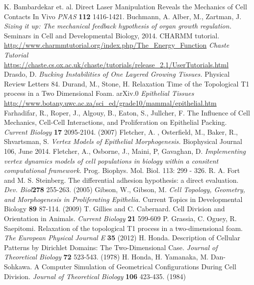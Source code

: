 \begin{thebibliography}{1}
 K. Bambardekar et. al. Direct Laser Manipulation Reveals the Mechanics of Cell Contacts In Vivo \emph{PNAS} \textbf{112} 1416-1421.
 Buchmann, A. Alber, M., Zartman, J. \emph{ Sizing it up: The mechanical feedback hypothesis of organ growth regulation.} Seminars in Cell and Developmental Biology, 2014.
 CHARMM tutorial. \url{http://www.charmmtutorial.org/index.php/The_Energy_Function}
 \emph{Chaste Tutorial} \url{https://chaste.cs.ox.ac.uk/chaste/tutorials/release_2.1/UserTutorials.html}
 Drasdo, D. \emph{Bucking Instabilities of One Layered Growing Tissues.} Physical Review Letters 84.
 Durand, M., Stone, H. Relaxation Time of the Topological T1 process in a Two Dimensional Foam. arXiv.0
\emph{Epithelial Tissues} \url{http://www.botany.uwc.ac.za/sci_ed/grade10/mammal/epithelial.htm}
 Farhadifar, R., Roper, J., Algouy, B., Eaton, S., Jullcher, F. The Influence of Cell Mechanics, Cell-Cell Interactions, and Proliferation on Epithelial Packing. \emph{Current Biology} \textbf{17} 2095-2104. (2007) 
 Fletcher, A. , Osterfield, M., Baker, R., Shvartsman, S. \emph{Vertex Models of Epithelial Morphogenesis.} Biophysical Journal 106, June 2014.
 Fletcher, A., Osborne, J., Maini, P, Gavaghan, D. \emph{Implementing vertex dynamics models of cell populations in biology within a consitent computational framework.} Prog. Biophys. Mol. Biol. 113: 299 - 326.
 R. A. Fort and M. S. Steinberg. The differential adhesion hypothesis: a direct evaluation. \emph{Dev. Biol}\textbf{278} 255-263. (2005)
 Gibson, W., Gibson, M. \emph{Cell Topology, Geometry, and Morphogenesis  in Proliferating Epithelia.} Current Topics in Developmental Biology \textbf{89} 87-114. (2009)
 T. Gillies and C. Cabernard. Cell Division and Orientation in Animals. \emph{Current Biology} \textbf{21} 599-609
 P. Grassia, C. Oguey, R. Saepitomi. Relaxation of the topological T1 process in a two-dimensional foam. \emph{The European Physical Journal E} \textbf{35} (2012)
 H. Honda. Description of Cellular Patterns by Dirichlet Domains: The Two-Dimensional Case. \emph{Journal of Theoretical Biology} \textbf{72} 523-543. (1978)
 H. Honda, H. Yamanaka, M. Dan-Sohkawa. A Computer Simulation of Geometrical Configurations During Cell Division. \emph{Journal of Theoretical Biology} \textbf{106} 423-435. (1984)

\end{thebibliography}
